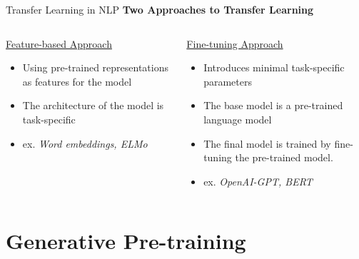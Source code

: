 \documentclass[aspectratio=169]{beamer}
\begin{document}
\begin{frame}{Transfer Learning in NLP}
\centering
\textbf{Two Approaches to Transfer Learning}
\vspace{.3cm}

\begin{columns}
\begin{column}{0.5\textwidth}
   \centering 
   \underline{Feature-based Approach}
   
   \begin{itemize}
   	\item Using pre-trained representations as features for the model
	\item The architecture of the model is task-specific
	\item ex. \textit{Word embeddings, ELMo}
   \end{itemize}
   
\end{column}
\begin{column}{0.5\textwidth}  %
    \centering
    \underline{Fine-tuning Approach}
    
    \begin{itemize}
	\item Introduces minimal task-specific parameters
	\item The base model is a pre-trained language model
	\item The final model is trained by fine-tuning the pre-trained model.
	\item ex. \textit{OpenAI-GPT, BERT}
    \end{itemize}

\end{column}
\end{columns}
\end{frame}

\section{Generative Pre-training}
\end{document}
